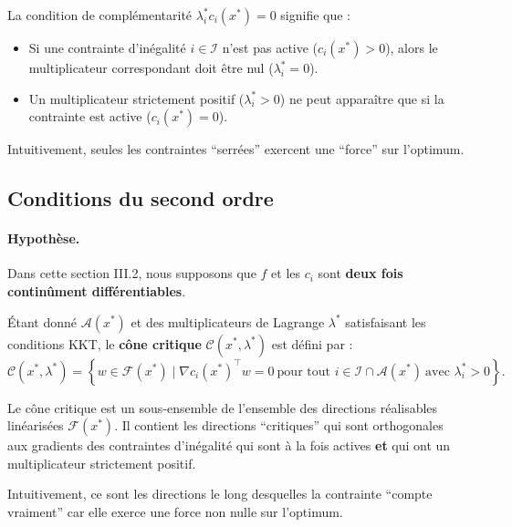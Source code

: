 \begin{remarque}
    La condition de complémentarité $\lambda_i^* c_i(x^*) = 0$ signifie que :
    \begin{itemize}
        \item Si une contrainte d'inégalité $i \in \mathcal{I}$ n'est pas active ($c_i(x^*) > 0$), alors le multiplicateur correspondant doit être nul ($\lambda_i^* = 0$).
        \item Un multiplicateur strictement positif ($\lambda_i^* > 0$) ne peut apparaître que si la contrainte est active ($c_i(x^*) = 0$).
    \end{itemize}
    Intuitivement, seules les contraintes ``serrées'' exercent une ``force'' sur l'optimum.
\end{remarque}

\subsection{Conditions du second ordre}

\paragraph{Hypothèse.} Dans cette section III.2, nous supposons que $f$ et les $c_i$ sont \textbf{deux fois continûment différentiables}.

\begin{definition}
    Étant donné $\mathcal{A}(x^*)$ et des multiplicateurs de Lagrange $\lambda^*$ satisfaisant les conditions KKT, le \textbf{cône critique} $\mathcal{C}(x^*, \lambda^*)$ est défini par :
    \begin{equation}
        \mathcal{C}(x^*, \lambda^*) = \left\{ w \in \mathcal{F}(x^*) \mid \nabla c_i(x^*)^\top w = 0 \ \text{pour tout } i \in \mathcal{I} \cap \mathcal{A}(x^*) \ \text{avec } \lambda_i^* > 0 \right\}.
    \end{equation}
\end{definition}

\begin{remarque}
    Le cône critique est un sous-ensemble de l'ensemble des directions réalisables linéarisées $\mathcal{F}(x^*)$. Il contient les directions ``critiques'' qui sont orthogonales aux gradients des contraintes d'inégalité qui sont à la fois actives \textbf{et} qui ont un multiplicateur strictement positif.
    
    Intuitivement, ce sont les directions le long desquelles la contrainte ``compte vraiment'' car elle exerce une force non nulle sur l'optimum.
\end{remarque}

